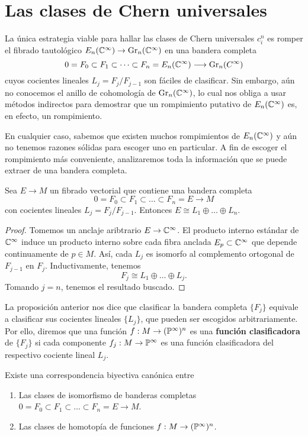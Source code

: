 \section{Las clases de Chern universales}

La única estrategia viable para hallar las clases de Chern universales $c_i^n$ es romper el fibrado tautológico $E_n(\C^\infty) \to \Gr_n(\C^\infty)$ en una bandera completa
$$0 = F_0 \subset F_1 \subset \dots \subset F_n = E_n(\C^\infty) \longrightarrow \Gr_n(C^\infty)$$
cuyos cocientes lineales $L_j = F_j / F_{j-1}$ son fáciles de clasificar. Sin embargo, aún no conocemos el anillo de cohomología de $\Gr_n(\C^\infty)$, lo cual nos obliga a usar métodos indirectos para demostrar que un rompimiento putativo de $E_n(\C^\infty)$ es, en efecto, un rompimiento.

En cualquier caso, sabemos que existen muchos rompimientos de $E_n(\C^\infty)$ y aún no tenemos razones sólidas para escoger uno en particular. A fin de escoger el rompimiento más conveniente, analizaremos toda la información que se puede extraer de una bandera completa.

\begin{proposition}
Sea $E \to M$ un fibrado vectorial que contiene una bandera completa
$$0 = F_0 \subset F_1 \subset \dots \subset F_n = E \longrightarrow M$$
con cocientes lineales $L_j = F_j / F_{j-1}$. Entonces $E \cong L_1 \oplus \dots \oplus L_n$.
\end{proposition}

\begin{proof}
Tomemos un anclaje aribtrario $E \to \C^\infty$. El producto interno estándar de $\C^\infty$ induce un producto interno sobre cada fibra anclada $E_p \subset \C^\infty$ que depende continuamente de $p \in M$. Así, cada $L_j$ es isomorfo al complemento ortogonal de $F_{j-1}$ en $F_j$. Inductivamente, tenemos
$$F_j \cong L_1 \oplus \dots \oplus L_j.$$
Tomando $j = n$, tenemos el resultado buscado.
\end{proof}

La proposición anterior nos dice que clasificar la bandera completa $\{ F_j \}$ equivale a clasificar sus cocientes lineales $\{ L_j \}$, que pueden ser escogidos arbitrariamente. Por ello, diremos que una función $f : M \to (\P^\infty)^n$ es una \textbf{función clasificadora} de $\{ F_j \}$ si cada componente $f_j : M \to \P^\infty$ es una función clasificadora del respectivo cociente lineal $L_j$.

\begin{proposition}
Existe una correspondencia biyectiva canónica entre
\begin{enumerate}[label=\alph*)]
    \itemsep 0em
    \item Las clases de isomorfismo de banderas completas $0 = F_0 \subset F_1 \subset \dots \subset F_n = E \to M$.
    \item Las clases de homotopía de funciones $f : M \to (\P^\infty)^n$.
\end{enumerate}
\end{proposition}

